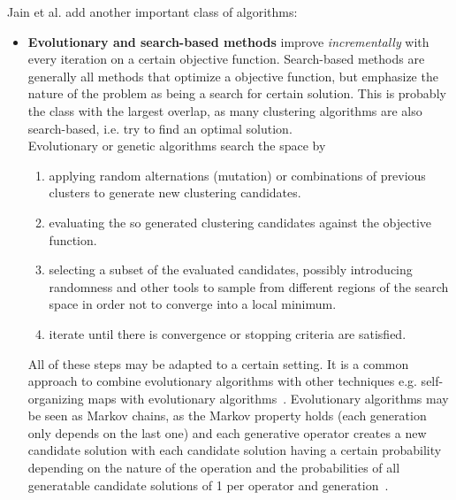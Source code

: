 Jain et al. add another important class of algorithms:
\begin{itemize}
    \item \textbf{Evolutionary and search-based methods} improve \textit{incrementally} with every iteration on a certain objective function. Search-based methods are generally all methods that optimize a objective function, but emphasize the nature of the problem as being a search for certain solution. This is probably the class with the largest overlap, as many clustering algorithms are also search-based, i.e. try to find an optimal solution. \\
    Evolutionary or genetic algorithms search the space by 
    \begin{enumerate}
        \item applying random alternations (mutation) or combinations of previous clusters to generate new clustering candidates.
        \item evaluating the so generated clustering candidates against the objective function.
        \item selecting a subset of the evaluated candidates, possibly introducing randomness and other tools to sample from different regions of the search space in order not to converge into a local minimum.
        \item iterate until there is convergence or stopping criteria are satisfied.
    \end{enumerate}
    All of these steps may be adapted to a certain setting. It is a common approach to combine evolutionary algorithms with other techniques e.g. self-organizing maps with evolutionary algorithms~\cite{leng2006design}. Evolutionary algorithms may be seen as Markov chains, as the Markov property holds (each generation only depends on the last one) and each generative operator creates a new candidate solution with each candidate solution having a certain probability depending on the nature of the operation and the probabilities of all generatable candidate solutions of 1 per operator and generation~\cite{Nix1992}. \\
\end{itemize}

